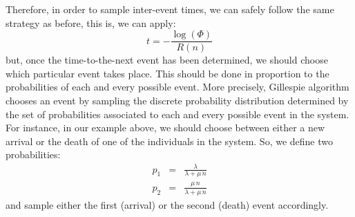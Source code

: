 Therefore, in order to sample inter-event times, we can safely follow the same strategy as before, this is, we can apply:
\begin{equation}
t     = -\frac{\log(\Phi)}{R(n)}
\label{Random_Time_General}
\end{equation}
but, once the time-to-the-next event has been determined, we should choose which particular event takes place. This should be done in proportion to the probabilities of each and every possible event. More precisely, Gillespie algorithm chooses an event by sampling the discrete probability distribution determined by the set of probabilities associated to each and every possible event in the system. For instance, in our example above, we should choose between either a new arrival or the death of one of the individuals in the system. So, we define two probabilities:
\begin{eqnarray}
p_1 &=& \frac{\lambda}{\lambda + \mu\,n} \nonumber \\
p_2 &=& \frac{\mu\,n}{\lambda + \mu\,n}  \label{p_1p_2}
\end{eqnarray}
and sample either the first (arrival) or the second (death) event accordingly. 
\smallskip


